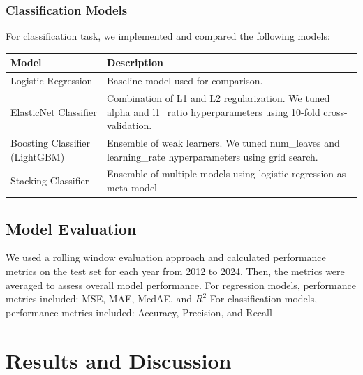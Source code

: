 \documentclass[12pt]{article}
\begin{document}
\subsubsection{Classification Models}
For classification task, we implemented and compared the following models:

\begin{singlespace}
\begin{table}[H]
\centering
\begin{tabular}{p{4cm} p{9.5cm}}
\toprule
\textbf{Model} & \textbf{Description} \\
\midrule
Logistic Regression & Baseline model used for comparison. \\
ElasticNet Classifier & Combination of L1 and L2 regularization. We tuned alpha and l1\_ratio hyperparameters using 10-fold cross-validation. \\
Boosting Classifier (LightGBM) & Ensemble of weak learners. We tuned num\_leaves and learning\_rate hyperparameters using grid search. \\
Stacking Classifier & Ensemble of multiple models using logistic regression as meta-model \\
\bottomrule
\end{tabular}
\end{table}
\end{singlespace}

\subsection{Model Evaluation}
We used a rolling window evaluation approach and calculated performance metrics on the test set for each year from 2012 to 2024. Then, the metrics were averaged to assess overall model performance.
For regression models, performance metrics included: MSE, MAE, MedAE, and $R^2$
For classification models, performance metrics included: Accuracy, Precision, and Recall

\section{Results and Discussion}
\end{document}
